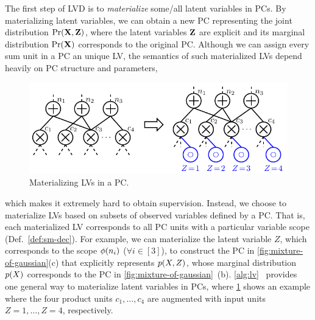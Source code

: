 \documentclass{article} %
\begin{document}
The first step of LVD is to \emph{materialize} some/all latent variables in PCs. By materializing latent variables, we can obtain a new PC representing the joint distribution $\Pr(\mathbf{X}, \mathbf{Z})$, where the latent variables $\mathbf{Z}$ are explicit and its marginal distribution $\Pr(\mathbf{X})$ corresponds to the original PC. 
Although we can assign every sum unit in a PC an unique LV, the semantics of such materialized LVs depend heavily on PC structure and parameters, 
\begin{figure}
    \centering
    \vspace{-0.4em}
    \includegraphics[width=0.5\columnwidth]{figures/fig-add-lvs.pdf}
    \vspace{-2.0em}
    \caption{Materializing LVs in a PC.}
    \label{fig:add-lvs}
    \vspace{-1.2em}
\end{figure}
which makes it extremely hard to obtain supervision. 
Instead, we choose to materialize LVs based on subsets of observed variables defined by a PC. That is, each materialized LV corresponds to all PC units with a particular variable scope (\cf Def.~\ref{def:sm-dec}). 
For example, we can materialize the latent variable $Z$, which corresponds to the scope ${\phi}(n_i)$ ($\forall i \!\in\! [3]$), to construct the PC in \cref{fig:mixture-of-gaussian}(c) that explicitly represents ${p}(X, Z)$, whose marginal distribution ${p}(X)$ corresponds to the PC in \cref{fig:mixture-of-gaussian}~(b). \cref{alg:lv}~\citep{peharz2016latent} provides one general way to materialize latent variables in PCs, where \cref{fig:add-lvs} shows an example where the four product units $c_1, \dots, c_4$ are augmented with input units $Z\!=\!1, \dots, Z\!=\!4$, respectively. 
\end{document}
